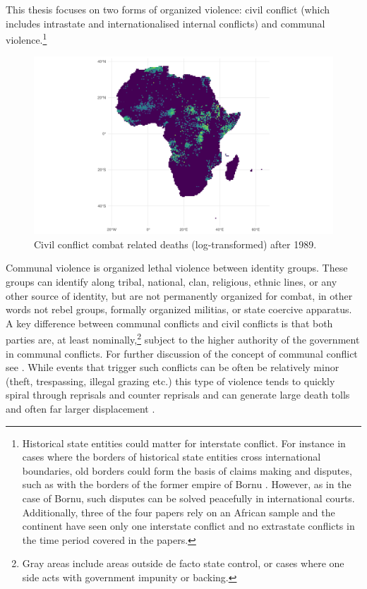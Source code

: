 This thesis focuses on two forms of organized violence: civil conflict (which
includes intrastate and internationalised internal conflicts) and communal
violence.\footnote{Historical state entities could matter for interstate
	conflict. For instance in cases where the borders of historical state
	entities cross international boundaries, old borders could form the
	basis of claims making and disputes, such as with the borders of the
	former empire of Bornu \citep{Hariri2012}. However, as in the case of
	Bornu, such disputes can be solved peacefully in international courts.
	Additionally, three of the four papers rely on an African sample and the
	continent have seen only one interstate conflict and no extrastate
conflicts in the time period covered in the papers.} 

\begin{figure}[hbpt]
	\centering
	\includegraphics[width=\textwidth]{../R/Output/civilconflictAfrica.pdf}
	\caption{Civil conflict combat related deaths (log-transformed) after 1989.}
	\label{gedAfrica}
\end{figure}

Communal violence is organized lethal violence between identity groups. These
groups can identify along tribal, national, clan, religious, ethnic lines, or
any other source of identity, but are not permanently organized for combat, in
other words not rebel groups, formally organized militias, or state coercive
apparatus. A key difference between communal conflicts and civil conflicts is
that both parties are, at least nominally,\footnote{Gray areas include areas
	outside de facto state control, or cases where one side acts with
government impunity or backing.} subject to the higher authority of the
government in communal conflicts. For further discussion of the concept of
communal conflict see \citet{BroscheJohan2012Cccw}. While events that trigger
such conflicts can be often be relatively minor (theft, trespassing, illegal
grazing etc.) this type of violence tends to quickly spiral through reprisals
and counter reprisals and can generate large death tolls and often far larger
displacement \citep{Horowitz_2001}. 


